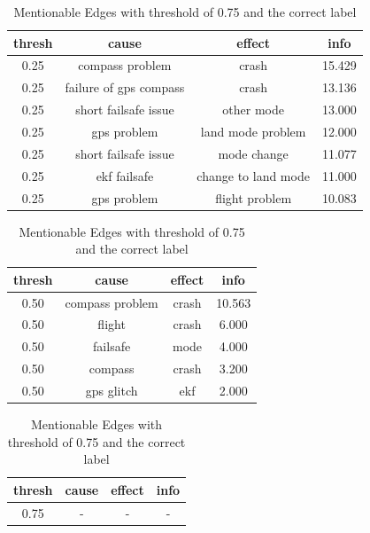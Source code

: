 \begin{table}
    \begin{center}
        \begin{tabular}[t]{||c c c c||}
            \hline
            thresh & cause                  & effect              & info \\ [0.5ex]
            \hline\hline
            0.25   & compass problem        & crash               & 15.429 \\ \hline
            0.25   & failure of gps compass & crash               & 13.136 \\ \hline
            0.25   & short failsafe issue   & other mode          & 13.000 \\ \hline
            0.25   & gps problem            & land mode problem   & 12.000 \\ \hline
            0.25   & short failsafe issue   & mode change         & 11.077 \\ \hline
            0.25   & ekf failsafe           & change to land mode & 11.000 \\ \hline
            0.25   & gps problem            & flight problem      & 10.083 \\ \hline
        \end{tabular}
        \caption{Mentionable Edges with threshold of 0.25 and the correct label}\label{tab:information-score-25-correct}
        \begin{tabular}[t]{||c c c c||}
            \hline
            thresh & cause           & effect & info \\ [0.5ex]
            \hline\hline
            0.50   & compass problem & crash  & 10.563 \\ \hline
            0.50   & flight          & crash  & 6.000  \\ \hline
            0.50   & failsafe        & mode   & 4.000  \\ \hline
            0.50   & compass         & crash  & 3.200  \\ \hline
            0.50   & gps glitch      & ekf    & 2.000  \\ \hline
        \end{tabular}
        \caption{Mentionable Edges with threshold of 0.50 and the correct label}\label{tab:information-score-50-correct}
        \begin{tabular}[t]{||c c c c||}
            \hline
            thresh & cause & effect & info \\ [0.5ex]
            \hline\hline
            0.75   & -     & -      & -    \\ \hline
        \end{tabular}
        \caption{Mentionable Edges with threshold of 0.75 and the correct label}\label{tab:information-score-75-correct}
    \end{center}
\end{table}

